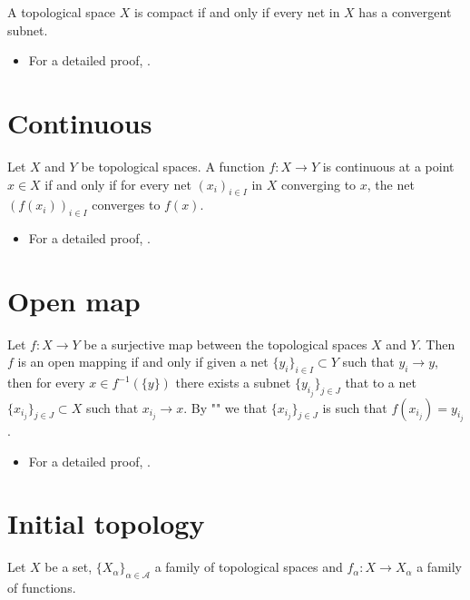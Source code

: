 \documentclass[12pt]{article}
\begin{document}
A topological space $X$ is compact if and only if every net in $X$ has a convergent subnet.

\begin{itemize}
\item For a detailed proof, .
\end{itemize}

\section{Continuous}

Let $X$ and $Y$ be topological spaces. A function $f:X \to Y$ is continuous at a point $x \in X$ if and only if for every net $(x_i)_{i \in I}$ in $X$ converging to $x$, the net $(f(x_i))_{i \in I}$ converges to $f(x)$.

\begin{itemize}
\item For a detailed proof, .
\end{itemize}

\section{Open map}

Let $f:X \longrightarrow Y$ be a surjective map between the topological spaces $X$ and $Y$. Then $f$ is an open mapping if and only if given a net $\{y_i\}_{i \in I} \subset Y$ such that $y_i \longrightarrow y$, then for every $x \in f^{-1}(\{y\})$ there exists a subnet $\{y_{i_j}\}_{j \in J}$ that  to a net $\{x_{i_j}\}_{j \in J} \subset X$ such that $x_{i_j} \longrightarrow x$. By "" we  that $\{x_{i_j}\}_{j \in J}$ is such that $ f(x_{i_j}) = y_{i_j}$.

\begin{itemize}
\item For a detailed proof, .
\end{itemize}

\section{Initial topology}

Let $X$ be a set, $\{X_{\alpha}\}_{\alpha \in \mathcal{A}}$ a family of topological spaces and $f_{\alpha}: X \to X_{\alpha}$ a family of functions. 
\end{document}
